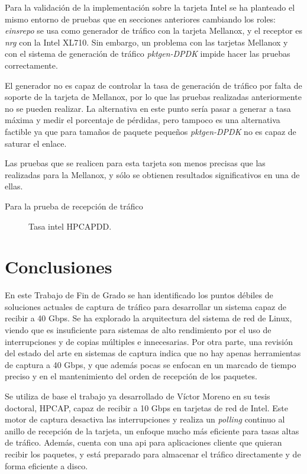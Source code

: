 \documentclass[twoside, 12pt, draft]{epstfg}
\begin{document}
Para la validación de la implementación sobre la tarjeta Intel se ha planteado el mismo entorno de pruebas que en secciones anteriores cambiando los roles: \textit{einsrepo} se usa como generador de tráfico con la tarjeta Mellanox, y el receptor es \textit{nrg} con la Intel XL710. Sin embargo, un problema con las tarjetas Mellanox y con el sistema de generación de tráfico \textit{pktgen-DPDK} impide hacer las pruebas correctamente.

El generador no es capaz de controlar la tasa de generación de tráfico por falta de soporte de la tarjeta de Mellanox, por lo que las pruebas realizadas anteriormente no se pueden realizar. La alternativa en este punto sería pasar a generar a tasa máxima y medir el porcentaje de pérdidas, pero tampoco es una alternativa factible ya que para tamaños de paquete pequeños \textit{pktgen-DPDK} no es capaz de saturar el enlace.

Las pruebas que se realicen para esta tarjeta son menos precisas que las realizadas para la Mellanox, y sólo se obtienen resultados significativos en una de ellas.

Para la prueba de recepción de tráfico 

\begin{figure}[hbtp]
\caption[Tasa para la tarjeta Intel]{Tasa intel HPCAPDD.}
\label{fig:Validacion:IntelHpcapdd}
\end{figure}

\chapter{Conclusiones}
\label{chap:Conclusiones}

En este Trabajo de Fin de Grado se han identificado los puntos débiles de soluciones actuales de captura de tráfico para desarrollar un sistema capaz de recibir a 40 Gbps. Se ha explorado la arquitectura del sistema de red de Linux, viendo que es insuficiente para sistemas de alto rendimiento por el uso de interrupciones y de copias múltiples e innecesarias. Por otra parte, una revisión del estado del arte en sistemas de captura indica que no hay apenas herramientas de captura a 40 Gbps, y que además pocas se enfocan en un marcado de tiempo preciso y en el mantenimiento del orden de recepción de los paquetes.

Se utiliza de base el trabajo ya desarrollado de Víctor Moreno en su tesis doctoral, HPCAP, capaz de recibir a 10 Gbps en tarjetas de red de Intel. Este motor de captura desactiva las interrupciones y realiza un \textit{polling} continuo al anillo de recepción de la tarjeta, un enfoque mucho más eficiente para tasas altas de tráfico. Además, cuenta con una \gls{api} para aplicaciones cliente que quieran recibir los paquetes, y está preparado para almacenar el tráfico directamente y de forma eficiente a disco.
\end{document}
